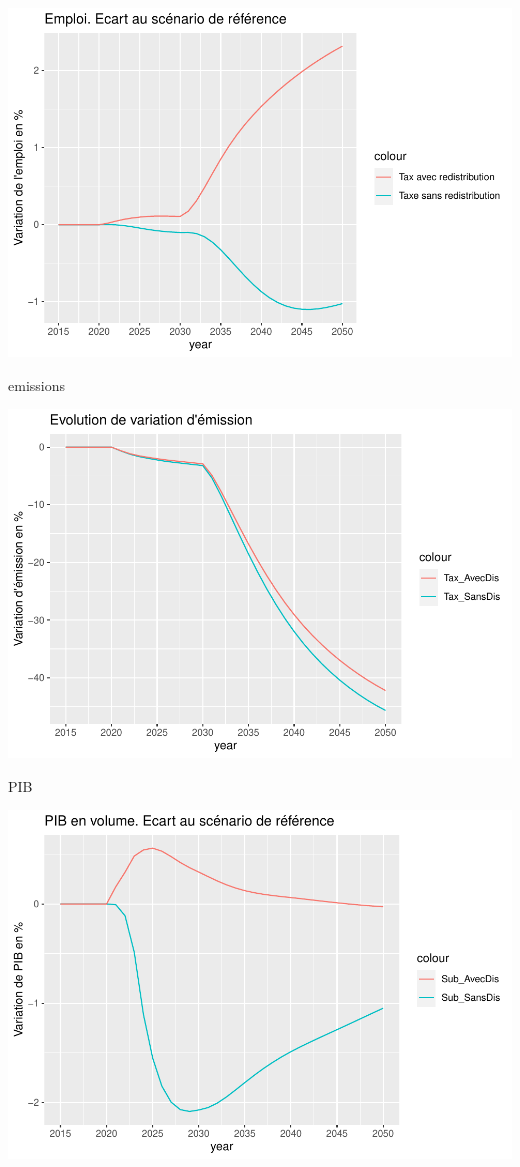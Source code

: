 \documentclass[
]{article}
\begin{document}
\begin{center}\includegraphics[width=0.7\linewidth,height=0.7\textheight]{Modele-ThreeMe-Tunisie_Sequeira_Valilou_Wang_files/figure-latex/unnamed-chunk-9-1} \end{center}

emissions

\begin{center}\includegraphics[width=0.7\linewidth,height=0.7\textheight]{Modele-ThreeMe-Tunisie_Sequeira_Valilou_Wang_files/figure-latex/unnamed-chunk-10-1} \end{center}

PIB

\begin{center}\includegraphics[width=0.7\linewidth,height=0.7\textheight]{Modele-ThreeMe-Tunisie_Sequeira_Valilou_Wang_files/figure-latex/unnamed-chunk-11-1} \end{center}
\end{document}
